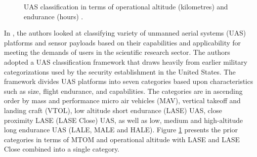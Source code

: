 \documentclass[english, 12pt, a4paper, elec, utf8, a-1b, online]{aaltothesis}
\begin{document}
\begin{figure}[h]
  \centering
  
  \caption{UAS classification in terms of operational altitude (kilometres) and endurance (hours) \cite{watts2012unmanned}.}
  \label{fig-3d-dhs-uas-classification}
\end{figure}

In \cite{watts2012unmanned}, the authors looked at classifying variety of unmanned aerial systems (UAS) platforms and sensor payloads based on their capabilities and applicability for meeting the demands of users in the scientific research sector.
The authors adopted a UAS classification framework that draws heavily from earlier military categorizations used by the security establishment in the United States.
The framework divides UAS platforms into seven categories based upon characteristics such as size, flight endurance, and capabilities.
The categories are in ascending order by mass and performance micro air vehicles (MAV), vertical takeoff and landing craft (VTOL), low altitude short endurance (LASE) UAS, close proximity LASE (LASE Close) UAS, as well as low, medium and high-altitude long endurance UAS (LALE, MALE and HALE).
Figure \ref{fig-3d-dhs-uas-classification} presents the prior categories in terms of MTOM and operational altitude with LASE and LASE Close combined into a single category.
\end{document}
